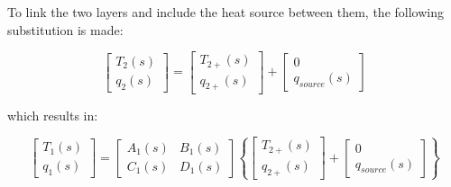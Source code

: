 To link the two layers and include the heat source between them, the following substitution is made:

\begin{equation}
\left[ {\begin{array}{ccc}{{T_2}\left( s \right)}\\ {{q_2}\left( s \right)}\end{array}} \right] = \left[ {\begin{array}{ccc}{{T_{2 + }}\left( s \right)}\\ {{q_{2 + }}\left( s \right)}\end{array}} \right] + \left[ {\begin{array}{ccc}0\\ {{q_{source}}\left( s \right)}\end{array}} \right]
\end{equation}

which results in:

\begin{equation}
\left[ {\begin{array}{ccc}{{T_1}\left( s \right)}\\ {{q_1}\left( s \right)}\end{array}} \right] = \left[ {\begin{array}{ccc}{{A_1}\left( s \right)}&{{B_1}\left( s \right)}\\ {{C_1}\left( s \right)}&{{D_1}\left( s \right)}\end{array}} \right]\left\{ {\left[ {\begin{array}{ccc}{{T_{2 + }}\left( s \right)}\\ {{q_{2 + }}\left( s \right)}\end{array}} \right] + \left[ {\begin{array}{ccc}0\\ {{q_{source}}\left( s \right)}\end{array}} \right]} \right\}
\end{equation}


